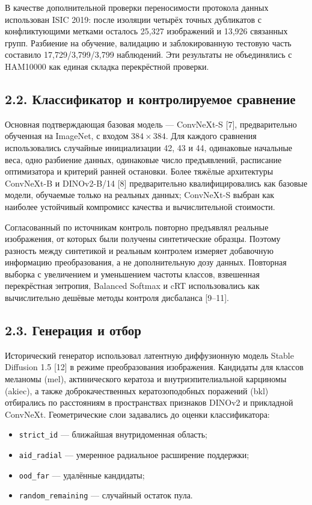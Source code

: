 \documentclass[12pt,a4paper]{article}
\begin{document}
В качестве дополнительной проверки переносимости протокола данных использован ISIC 2019: после изоляции четырёх точных дубликатов с конфликтующими метками осталось 25,327 изображений и 13,926 связанных групп. Разбиение на обучение, валидацию и заблокированную тестовую часть составило 17,729/3,799/3,799 наблюдений. Эти результаты не объединялись с HAM10000 как единая складка перекрёстной проверки.

\subsection*{2.2. Классификатор и контролируемое сравнение}

Основная подтверждающая базовая модель --- ConvNeXt-S [7], предварительно обученная на ImageNet, с входом $384\times384$. Для каждого сравнения использовались случайные инициализации 42, 43 и 44, одинаковые начальные веса, одно разбиение данных, одинаковые число предъявлений, расписание оптимизатора и критерий ранней остановки. Более тяжёлые архитектуры ConvNeXt-B и DINOv2-B/14 [8] предварительно квалифицировались как базовые модели, обучаемые только на реальных данных; ConvNeXt-S выбран как наиболее устойчивый компромисс качества и вычислительной стоимости.

Согласованный по источникам контроль повторно предъявлял реальные изображения, от которых были получены синтетические образцы. Поэтому разность между синтетикой и реальным контролем измеряет добавочную информацию преобразования, а не дополнительную дозу данных. Повторная выборка с увеличением и уменьшением частоты классов, взвешенная перекрёстная энтропия, Balanced Softmax и cRT использовались как вычислительно дешёвые методы контроля дисбаланса [9--11].

\subsection*{2.3. Генерация и отбор}

Исторический генератор использовал латентную диффузионную модель Stable Diffusion 1.5 [12] в режиме преобразования изображения. Кандидаты для классов меланомы (mel), актинического кератоза и внутриэпителиальной карциномы (akiec), а также доброкачественных кератозоподобных поражений (bkl) отбирались по расстояниям в пространствах признаков DINOv2 и прикладной ConvNeXt. Геометрические слои задавались до оценки классификатора:
\begin{itemize}[nosep,leftmargin=1.8em]
  \item \texttt{strict\_id} --- ближайшая внутридоменная область;
  \item \texttt{aid\_radial} --- умеренное радиальное расширение поддержки;
  \item \texttt{ood\_far} --- удалённые кандидаты;
  \item \texttt{random\_remaining} --- случайный остаток пула.
\end{itemize}
\end{document}

